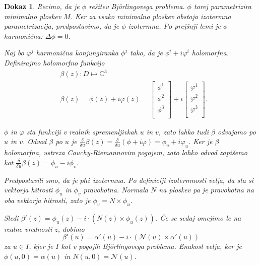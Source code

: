 \documentclass{article}
\newcommand{\C}{\mathbb C}
\newtheorem{dokaz}{Dokaz}
\begin{document}
        \begin{dokaz}
            Recimo, da je $\phi$ rešitev Björlingovega problema.
            $\phi$ torej parametrizira minimalno ploskev $M$.
            Ker za vsako minimalno ploskev obstaja izotermna parametrizacija, predpostavimo, da je $\phi$ izotermna.
            Po prejšnji lemi je $\phi$ harmonična: $\Delta \phi = 0$.
        
            Naj bo $\varphi^{j}$ harmonična konjungiranka $\phi^{j}$ tako, da je $\phi^{i} + i \varphi^{i}$ holomorfna.
            Definirajmo holomorfno funkcijo
            \begin{align*}
                & \beta (z) : D \mapsto \C^3 \\
                & \beta (z) = \phi (z) + i \varphi (z) = \left[
                \begin{matrix}
                    \phi^{1} \\
                    \phi^{2} \\
                    \phi^{3} \\
                \end{matrix} \right]
                + i \left[
                \begin{matrix}
                    \varphi^{1} \\
                    \varphi^{2} \\
                    \varphi^{3} \\
                \end{matrix} \right].
            \end{align*}
        
            $\phi$ in $\varphi$ sta funkciji v realnih spremenljivkah $u$ in $v$, zato lahko tudi $\beta$ odvajamo po $u$ in $v$.
            Odvod $\beta$ po $u$ je $\frac{\delta}{\delta u} \beta(z) = \frac{\delta}{\delta u} (\phi + i \varphi) = \phi_u + i \varphi_u$.
            Ker je $\beta$ holomorfna, ustreza Cauchy-Riemannovim pogojem, zato lahko odvod zapišemo kot $\frac{\delta}{\delta u} \beta(z) = \phi_u - i \phi_v$.
        
            Predpostavili smo, da je $phi$ izotermna. Po definiciji izotermnosti velja, da sta si vektorja hitrosti $\phi_u$ in $\phi_v$
            pravokotna. Normala $N$ na ploskev pa je pravokotna na oba vektorja hitrosti, zato je $\phi_v = N \times \phi_u$.
        
            Sledi $\beta'(z) = \phi_u(z) - i \cdot \left( N(z) \times \phi_u(z) \right)$.
            Če se sedaj omejimo le na realne vrednosti $z$, dobimo 
            $$\beta'(u) = \alpha'(u) - i \cdot \left( \mathcal{N} (u) \times \alpha'(u) \right)$$
            za $u \in I$, kjer je $I$ kot v pogojih Björlingovega problema. Enakost velja, ker je $\phi(u, 0) = \alpha(u)$ in $N(u, 0) = \mathcal{N} (u)$.
        

\end{dokaz}
\end{document}
